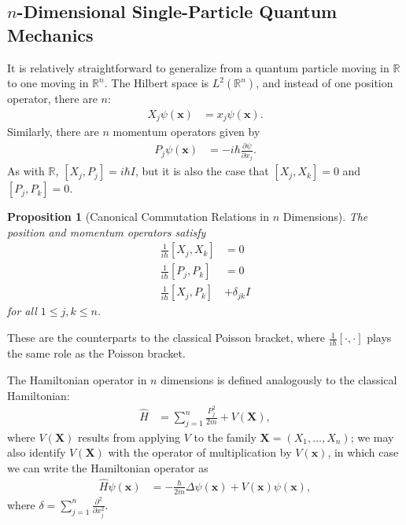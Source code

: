 \documentclass[10pt]{extarticle}
\newcommand{\R}{\mathbb{R}}
\theoremstyle{plain}
\newtheorem*{proposition}{Proposition}%
\theoremstyle{definition}
\theoremstyle{remark}
\renewcommand{\newline}{\hfill\break}
\begin{document}
  \subsection{$n$-Dimensional Single-Particle Quantum Mechanics}%
  It is relatively straightforward to generalize from a quantum particle moving in $\R$ to one moving in $\R^n$. The Hilbert space is $L^{2}(\R^n)$, and instead of one position operator, there are $n$:
  \begin{align*}
    X_j\psi(\mathbf{x}) &= x_j\psi(\mathbf{x}).
  \end{align*}
  Similarly, there are $n$ momentum operators given by
  \begin{align*}
    P_j\psi(\mathbf{x}) &= -i\hbar \frac{\partial \psi}{\partial x_j}.
  \end{align*}
  As with $\R$, $[X_j,P_j] = i\hbar I$, but it is also the case that $[X_j,X_k] = 0$ and $[P_j,P_k] = 0$.
  \begin{proposition}[Canonical Commutation Relations in $n$ Dimensions]
    The position and momentum operators satisfy
    \begin{align*}
      \frac{1}{i\hbar}[X_j,X_k] &= 0\\
      \frac{1}{i\hbar}[P_j,P_k] &= 0\\
      \frac{1}{i\hbar}[X_j,P_k] &+ \delta_{jk}I
    \end{align*}
    for all $1 \leq j,k \leq n$.
  \end{proposition}
  These are the counterparts to the classical Poisson bracket, where $\frac{1}{i\hbar}[\cdot,\cdot]$ plays the same role as the Poisson bracket.\newline

  The Hamiltonian operator in $n$ dimensions is defined analogously to the classical Hamiltonian:
  \begin{align*}
    \hat{H} &= \sum_{j=1}^{n}\frac{P_j^2}{2m} + V(\mathbf{X}),
  \end{align*}
  where $V(\mathbf{X})$ results from applying $V$ to the family $\mathbf{X} = (X_1,\dots,X_n)$; we may also identify $V(\mathbf{X})$ with the operator of multiplication by $V(\mathbf{x})$, in which case we can write the Hamiltonian operator as
  \begin{align*}
    \hat{H}\psi(\mathbf{x}) &= -\frac{\hbar}{2m}\Delta \psi(\mathbf{x}) + V(\mathbf{x})\psi(\mathbf{x}),
  \end{align*}
  where $\delta = \sum_{j=1}^{n}\frac{\partial^2}{\partial x_j^2}$.\newline
\end{document}
